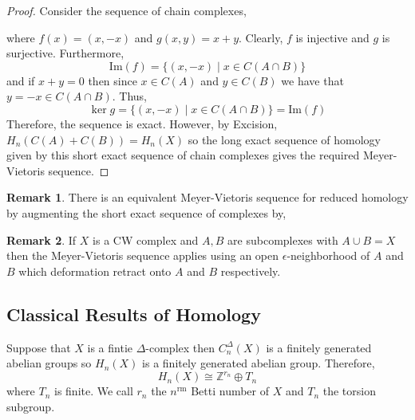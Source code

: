 \documentclass[12pt]{extarticle}
\newcommand{\Z}{\mathbb{Z}}
\renewcommand{\Im}[1]{\mathrm{Im}(#1)}
\theoremstyle{definition}
\newtheorem{remark}{Remark}
\newenvironment{definition}[1][Definition:]{\begin{trivlist}
\item[\hskip \labelsep {\bfseries #1}]}{\end{trivlist}}
\begin{document}
\begin{proof}
Consider the sequence of chain complexes,
\begin{center}
\end{center}
where $f(x) = (x, -x)$ and $g(x,y) = x + y$. Clearly, $f$ is injective and $g$ is surjective. Furthermore, 
\[\Im{f} = \{ (x, -x) \mid x \in C(A \cap B) \}\]
and if $x + y = 0$ then since $x \in C(A)$ and $y \in C(B)$ we have that $y = -x \in C(A \cap B)$. Thus, 
\[\ker{g} = \{ (x, -x) \mid x \in C(A \cap B) \} = \Im{f}\]
Therefore, the sequence is exact.
However, by Excision, $H_n(C(A) + C(B)) = H_n(X)$ so the long exact sequence of homology given by this short exact sequence of chain complexes gives the required Meyer-Vietoris sequence.
\end{proof}

\begin{remark}
There is an equivalent Meyer-Vietoris sequence for reduced homology by augmenting the short exact sequence of complexes by,
\begin{center}
\end{center}
\end{remark}

\begin{remark}
If $X$ is a CW complex and $A, B$ are subcomplexes with $A \cup B = X$ then the Meyer-Vietoris sequence applies using an open $\epsilon$-neighborhood of $A$ and $B$ which deformation retract onto $A$ and $B$ respectively. 
\end{remark}

\subsection{Classical Results of Homology}

\begin{definition}
Suppose that $X$ is a fintie $\Delta$-complex then $C^\Delta_n(X)$ is a finitely generated abelian groups so $H_n(X)$ is a finitely generated abelian group. Therefore,
\[ H_n(X) \cong \Z^{r_n} \oplus T_n\] where $T_n$ is finite. We call $r_n$ the $n^{\mathrm{rm}}$ Betti number of $X$ and $T_n$ the torsion subgroup. 
\end{definition}
\end{document}
